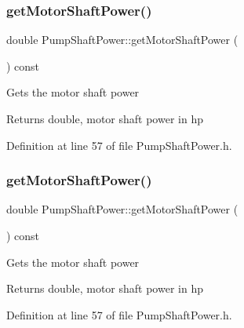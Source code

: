 \subsubsection{\texorpdfstring{get\+Motor\+Shaft\+Power()}{getMotorShaftPower()}\hspace{0.1cm}{\footnotesize\ttfamily [1/3]}}
{\footnotesize\ttfamily double Pump\+Shaft\+Power\+::get\+Motor\+Shaft\+Power (\begin{DoxyParamCaption}{ }\end{DoxyParamCaption}) const\hspace{0.3cm}{\ttfamily [inline]}}

Gets the motor shaft power \begin{DoxyReturn}{Returns}
double, motor shaft power in hp 
\end{DoxyReturn}


Definition at line 57 of file Pump\+Shaft\+Power.\+h.

\mbox{\label{class_pump_shaft_power_acb91eadb960f946ffee5373d4839a5be}} 
\subsubsection{\texorpdfstring{get\+Motor\+Shaft\+Power()}{getMotorShaftPower()}\hspace{0.1cm}{\footnotesize\ttfamily [2/3]}}
{\footnotesize\ttfamily double Pump\+Shaft\+Power\+::get\+Motor\+Shaft\+Power (\begin{DoxyParamCaption}{ }\end{DoxyParamCaption}) const\hspace{0.3cm}{\ttfamily [inline]}}

Gets the motor shaft power \begin{DoxyReturn}{Returns}
double, motor shaft power in hp 
\end{DoxyReturn}


Definition at line 57 of file Pump\+Shaft\+Power.\+h.

\mbox{\label{class_pump_shaft_power_acb91eadb960f946ffee5373d4839a5be}} 
